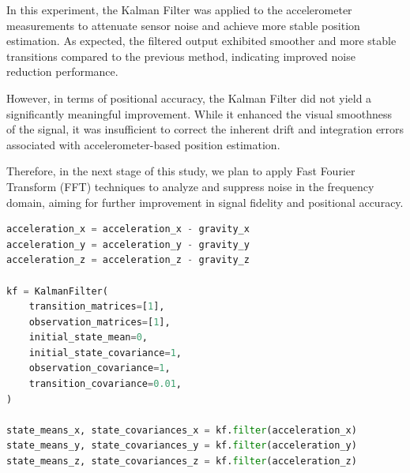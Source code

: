\documentclass{article}
\begin{document}
In this experiment, the Kalman Filter was applied to the accelerometer measurements to attenuate sensor noise and achieve more stable position estimation. As expected, the filtered output exhibited smoother and more stable transitions compared to the previous method, indicating improved noise reduction performance.

However, in terms of positional accuracy, the Kalman Filter did not yield a significantly meaningful improvement. While it enhanced the visual smoothness of the signal, it was insufficient to correct the inherent drift and integration errors associated with accelerometer-based position estimation.

Therefore, in the next stage of this study, we plan to apply Fast Fourier Transform (FFT) techniques to analyze and suppress noise in the frequency domain, aiming for further improvement in signal fidelity and positional accuracy.

\begin{lstlisting}[language=Python, caption={Kalman Filter for noise reduction}, label={lst:kalman_filter}]
acceleration_x = acceleration_x - gravity_x
acceleration_y = acceleration_y - gravity_y
acceleration_z = acceleration_z - gravity_z

kf = KalmanFilter(
    transition_matrices=[1],
    observation_matrices=[1],
    initial_state_mean=0,
    initial_state_covariance=1,
    observation_covariance=1,
    transition_covariance=0.01,
)

state_means_x, state_covariances_x = kf.filter(acceleration_x)
state_means_y, state_covariances_y = kf.filter(acceleration_y)
state_means_z, state_covariances_z = kf.filter(acceleration_z)
\end{lstlisting}
\end{document}
